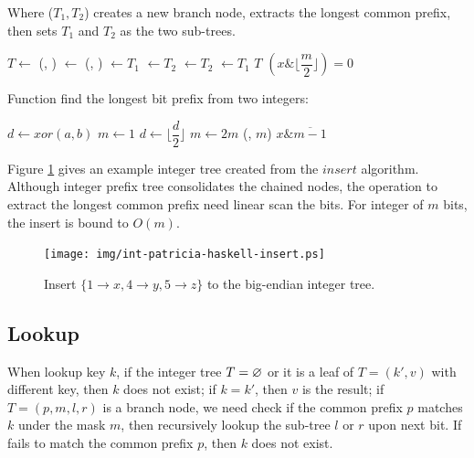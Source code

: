 \documentclass[b5paper]{article}
\begin{document}
Where ($T_1, T_2$) creates a new branch node, extracts the longest common prefix, then sets $T_1$ and $T_2$ as the two sub-trees.

\begin{algorithmic}[1]
  \State $T \gets$ 
  \State (, ) $\gets$ (, )
    \State {} $\gets T_1$
    \State {} $\gets T_2$
  \Else
    \State {} $\gets T_2$
    \State {} $\gets T_1$
  \EndIf
  \State \Return $T$
\EndFunction
\Statex
{}
  \State \Return $(x \& \lfloor \dfrac{m}{2} \rfloor) = 0$
\EndFunction
\end{algorithmic}

Function  find the longest bit prefix from two integers:

\begin{algorithmic}[1]
  \State $d \gets xor(a, b)$
  \State $m \gets 1$
    \State $d \gets \lfloor \dfrac{d}{2} \rfloor$
    \State $m \gets 2m$
  \EndWhile
  \State \Return (, $m$)
\EndFunction
\Statex
{}
  \State \Return $x \& \overline{m - 1}$
\EndFunction
\Statex
\end{algorithmic}

Figure \ref{fig:int-patricia-haskell-insert} gives an example integer tree created from the $insert$ algorithm. Although integer prefix tree consolidates the chained nodes, the operation to extract the longest common prefix need linear scan the bits. For integer of $m$ bits, the insert is bound to $O(m)$.

\begin{figure}[htbp]
  \centering
  \texttt{[image: img/int-patricia-haskell-insert.ps]}
  \caption{Insert $\{1 \rightarrow x, 4 \rightarrow y, 5 \rightarrow z\}$ to the big-endian integer tree.}
  \label{fig:int-patricia-haskell-insert}
\end{figure}


\subsection{Lookup}

When lookup key $k$, if the integer tree $T = \varnothing$ or it is a leaf of $T = (k', v)$ with different key, then $k$ does not exist; if $k = k'$, then $v$ is the result; if $T = (p, m, l, r)$ is a branch node, we need check if the common prefix $p$ matches $k$ under the mask $m$, then recursively lookup the sub-tree $l$ or $r$ upon next bit. If fails to match the common prefix $p$, then $k$ does not exist.
\end{document}
